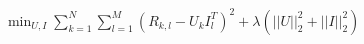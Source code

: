 \documentclass{standalone}
\begin{document}
\( \min_{U,I} \sum_{k = 1}^{N} \sum_{l = 1}^{M} (R_{k,l} - U_k I_l^T)^2 + \lambda (||U||_2^2 + ||I||_2^2) \)
\end{document}
